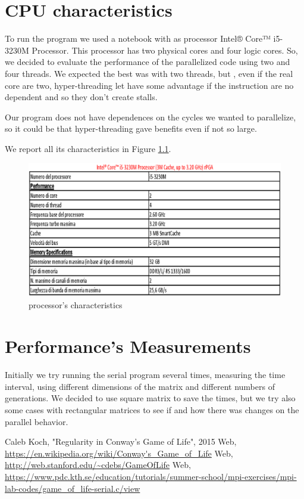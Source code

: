 \documentclass[a4paper,11pt,twoside]{report}
\begin{document}
	



\chapter{CPU characteristics}
To run the program we used a notebook with as processor Intel® Core™ i5-3230M Processor.
This processor has two physical cores and four logic cores. So, we decided to evaluate the performance of the parallelized code using two and four threads. We expected the best was with two threads, but , even if the real core are two, hyper-threading let have some advantage if the instruction are no dependent and so they don't create stalls. 

\noindent Our program does not have dependences on the cycles we wanted to parallelize, so it could be that hyper-threading gave benefits even if not so large.

\noindent We report all its characteristics in Figure \ref{fig:2}.

\begin{figure}
	\centering
	\includegraphics[scale = 0.5]{i5.eps}
	\caption{processor's characteristics} \label{fig:2}
\end{figure}	





\chapter{Performance's Measurements}
\noindent Initially we try running the serial program several times, measuring the time interval, using different dimensions of the matrix and different numbers of generations.
We decided to use square matrix to save the times, but we try also some cases with rectangular matrices to see if and how there was changes on the parallel behavior.
	





\begin{thebibliography}{9}
 Caleb Koch, "Regularity in Conway's Game of Life", 2015
 Web, \url{https://en.wikipedia.org/wiki/Conway's_Game_of_Life}
 Web, \url{http://web.stanford.edu/~cdebs/GameOfLife}
 Web, \url{https://www.pdc.kth.se/education/tutorials/summer-school/mpi-exercises/mpi-lab-codes/game_of_life-serial.c/view}
\end{thebibliography}
\end{document}
